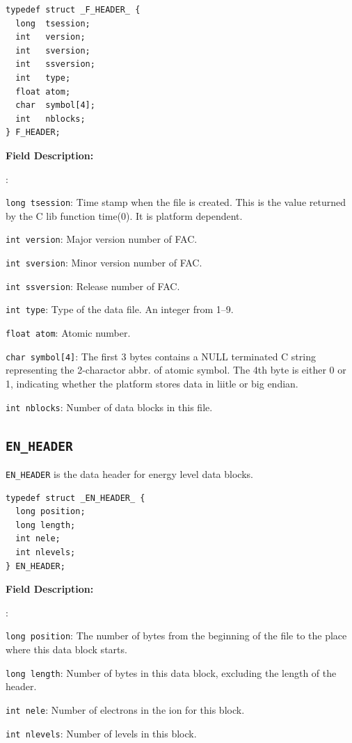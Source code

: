 \documentclass[twoside,letterpaper]{refrep}
\newenvironment{dbdesc}{\textbf{Field Description:} \begin{list}
	{:}{\setlength{\labelwidth}{2in}
	   \setlength{\leftmargin}{2in}
	   \setlength{\labelsep}{0.1in}
	   \setlength{\rightmargin}{0.2in}}}
	{\end{list}}
\begin{document}
\begin{verbatim}
typedef struct _F_HEADER_ {
  long  tsession;
  int   version;
  int   sversion;
  int   ssversion;
  int   type;
  float atom;
  char  symbol[4];
  int   nblocks;
} F_HEADER;
\end{verbatim}

\begin{dbdesc}
\item[\texttt{long tsession}:] Time stamp when the file is created. This is the
value returned by the C lib function time(0). It is platform dependent. 
\item[\texttt{int version}:] Major version number of FAC.
\item[\texttt{int sversion}:] Minor version number of FAC.
\item[\texttt{int ssversion}:] Release number of FAC.
\item[\texttt{int type}:] Type of the data file. An integer from 1--9.
\item[\texttt{float atom}:] Atomic number.
\item[\texttt{char symbol[4]}:] The first 3 bytes contains a NULL
terminated C string representing the 2-charactor abbr. of atomic symbol. The
4th byte is either 0 or 1, indicating whether the platform stores data in
liitle or big endian.
\item[\texttt{int nblocks}:] Number of data blocks in this file.
\end{dbdesc}

\subsection{\texttt{EN\_HEADER}}
\texttt{EN\_HEADER} is the data header for energy level data blocks.

\begin{verbatim}
typedef struct _EN_HEADER_ {
  long position;
  long length;
  int nele;
  int nlevels;
} EN_HEADER;
\end{verbatim}

\begin{dbdesc}
\item[\texttt{long position}:] The number of bytes from the beginning of the
file to the place where this data block starts.
\item[\texttt{long length}:] Number of bytes in this data block, excluding the
length of the header.
\item[\texttt{int nele}:] Number of electrons in the ion for this block.
\item[\texttt{int nlevels}:] Number of levels in this block.
\end{dbdesc}
\end{document}
